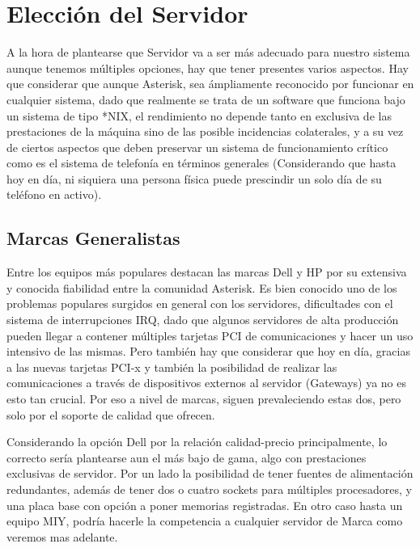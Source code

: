 
\section{Elección del Servidor}

A la hora de plantearse que Servidor va a ser más adecuado para nuestro sistema aunque tenemos múltiples opciones, hay que tener presentes varios aspectos. Hay que considerar que aunque Asterisk, sea ámpliamente reconocido por funcionar en cualquier sistema, dado que realmente se trata de un software que funciona bajo un sistema de tipo *NIX, el rendimiento no depende tanto en exclusiva de las prestaciones de la máquina sino de las posible incidencias colaterales, y a su vez de ciertos aspectos que deben preservar un sistema de funcionamiento crítico como es el sistema de telefonía en términos generales (Considerando que hasta hoy en día, ni siquiera una persona física puede prescindir un solo día de su teléfono en activo).

\subsection{Marcas Generalistas}

Entre los equipos más populares destacan las marcas Dell y HP por su extensiva y conocida fiabilidad entre la comunidad Asterisk. Es bien conocido uno de los problemas populares surgidos en general con los servidores, dificultades con el sistema de interrupciones IRQ, dado que algunos servidores de alta producción pueden llegar a contener múltiples tarjetas PCI de comunicaciones  y hacer un uso intensivo de las mismas. Pero también hay que considerar que hoy en día, gracias a las nuevas tarjetas PCI-x y también la posibilidad de realizar las comunicaciones a través de dispositivos externos al servidor (Gateways) ya no es esto tan crucial. Por eso a nivel de marcas, siguen prevaleciendo estas dos, pero solo por el soporte de calidad que ofrecen. 

Considerando la opción Dell por la relación calidad-precio principalmente, lo  correcto sería plantearse aun el más bajo de gama, algo con prestaciones exclusivas de servidor. Por un lado la posibilidad de tener fuentes de alimentación redundantes, además de tener dos o cuatro sockets para múltiples procesadores, y una placa base con opción a poner memorias registradas. En otro caso hasta un equipo MIY, podría hacerle la competencia a cualquier servidor de Marca como veremos mas adelante.

